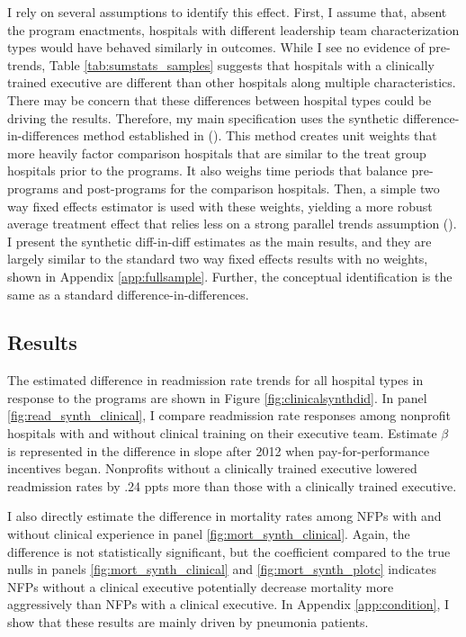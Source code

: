 \documentclass[12pt]{article}
\begin{document}
     I rely on several assumptions to identify this effect. First, I assume that, absent the program enactments, hospitals with different leadership team characterization types would have behaved similarly in outcomes. While I see no evidence of pre-trends, Table \ref{tab:sumstats_samples} suggests that hospitals with a clinically trained executive are different than other hospitals along multiple characteristics. There may be concern that these differences between hospital types could be driving the results. Therefore, my main specification uses the synthetic difference-in-differences method established in \citeauthor{arkhangelsky2021synthetic} (\citeyear{arkhangelsky2021synthetic}). This method creates unit weights that more heavily factor comparison hospitals that are similar to the treat group hospitals prior to the programs. It also weighs time periods that balance pre-programs and post-programs for the comparison hospitals. Then, a simple two way fixed effects estimator is used with these weights, yielding a more robust average treatment effect that relies less on a strong parallel trends assumption (\cite{arkhangelsky2021synthetic}). I present the synthetic diff-in-diff estimates as the main results, and they are largely similar to the standard two way fixed effects results with no weights, shown in Appendix \ref{app:fullsample}. Further, the conceptual identification is the same as a standard difference-in-differences.

    \subsection{Results}

    The estimated difference in readmission rate trends for all hospital types in response to the programs are shown in Figure \ref{fig:clinicalsynthdid}. In panel \ref{fig:read_synth_clinical}, I compare readmission rate responses among nonprofit hospitals with and without clinical training on their executive team. Estimate $\beta$ is represented in the difference in slope after 2012 when pay-for-performance incentives began. Nonprofits without a clinically trained executive lowered readmission rates by .24 ppts more than those with a clinically trained executive. 

    I also directly estimate the difference in mortality rates among NFPs with and without clinical experience in panel \ref{fig:mort_synth_clinical}. Again, the difference is not statistically significant, but the coefficient compared to the true nulls in panels \ref{fig:mort_synth_clinical} and \ref{fig:mort_synth_plotc} indicates NFPs without a clinical executive potentially decrease mortality more aggressively than NFPs with a clinical executive. In Appendix \ref{app:condition}, I show that these results are mainly driven by pneumonia patients.  
\end{document}
